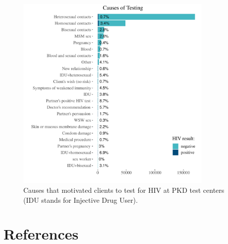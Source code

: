 \documentclass[
  12pt,
  letterpaper,
  DIV=11,
  numbers=noendperiod]{scrartcl}
\begin{document}
\begin{figure}

{\centering \includegraphics[width=0.85\textwidth,height=\textheight]{../visualizations/causesplott.pdf}

}

\caption{\label{fig-causes}Causes that motivated clients to test for HIV
at PKD test centers (IDU stands for Injective Drug User).}

\end{figure}

\pagebreak

\hypertarget{references}{%
\section*{References}\label{references}}
\end{document}
